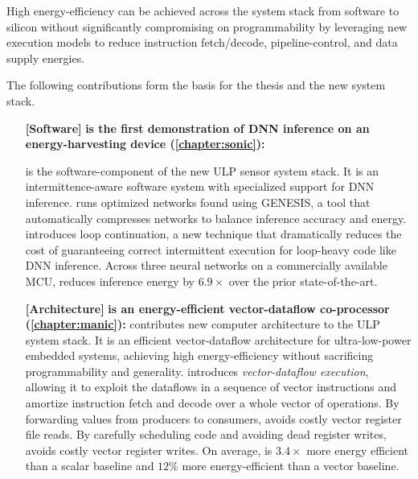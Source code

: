\begin{adjustwidth}{1cm}{1cm}
High energy-efficiency can be achieved 
across the system stack from software to silicon without significantly compromising on programmability by leveraging new execution models to reduce instruction fetch/decode, pipeline-control, and data supply energies.
% 

\end{adjustwidth}
% 
The following contributions form the basis for the thesis and the new system stack.

\begin{itemize}

\item[\textbf{[Software]}]
\textbf{\sonic is the first demonstration of DNN inference on an energy-harvesting device (\autoref{chapter:sonic}): }

\sonic is the software-component of the new ULP sensor system stack.
% 
It is an intermittence-aware software system with specialized support for DNN inference. 
% 
\sonic runs optimized networks found using GENESIS, a tool that automatically compresses networks to balance inference accuracy and energy.
% 
\sonic introduces loop continuation, a new technique that dramatically reduces the cost of guaranteeing correct intermittent execution for loop-heavy code like DNN inference. 
% 
Across three neural networks on a commercially available MCU, \sonic reduces inference energy by $6.9\times$ over the prior state-of-the-art.

\item[\textbf{[Architecture]}]
\textbf{\manic is an energy-efficient vector-dataflow co-processor (\autoref{chapter:manic}): }
\manic contributes new computer architecture to the ULP system stack.
% 
It is an efficient vector-dataflow architecture for ultra-low-power embedded systems, achieving high energy-efficiency without sacrificing programmability and generality.
% 
\manic introduces \emph{vector-dataflow execution}, allowing it to exploit the
dataflows in a sequence of vector instructions and amortize instruction
fetch and decode over a whole vector of operations.
%
By forwarding values from producers to consumers, \manic avoids costly vector register file reads.
% 
By carefully scheduling code and avoiding dead register writes, \manic avoids costly vector register writes.
% 
On average, \manic is $3.4\times$ more energy efficient than a scalar baseline and $12\%$ more energy-efficient than a vector baseline.


\end{itemize}
